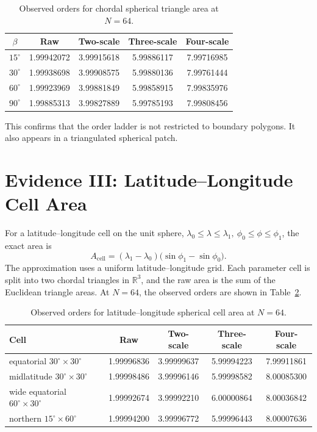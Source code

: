 \documentclass[11pt]{article}
\begin{document}
\begin{table}[h]
\centering
\begin{tabular}{ccccc}
\toprule
$\beta$ & Raw & Two-scale & Three-scale & Four-scale \\
\midrule
$15^\circ$ & 1.99942072 & 3.99915618 & 5.99886117 & 7.99716985 \\
$30^\circ$ & 1.99938698 & 3.99908575 & 5.99880136 & 7.99761444 \\
$60^\circ$ & 1.99923969 & 3.99881849 & 5.99858915 & 7.99835976 \\
$90^\circ$ & 1.99885313 & 3.99827889 & 5.99785193 & 7.99808456 \\
\bottomrule
\end{tabular}
\caption{Observed orders for chordal spherical triangle area at $N=64$.}
\label{tab:tri}
\end{table}

This confirms that the order ladder is not restricted to boundary polygons. It also
appears in a triangulated spherical patch.

\section{Evidence III: Latitude--Longitude Cell Area}
For a latitude--longitude cell on the unit sphere,
$\lambda_0 \le \lambda \le \lambda_1,\ \phi_0 \le \phi \le \phi_1$, the exact area is
\[
A_{\mathrm{cell}} = (\lambda_1 - \lambda_0)\bigl(\sin\phi_1 - \sin\phi_0\bigr).
\]
The approximation uses a uniform latitude--longitude grid. Each parameter cell is split
into two chordal triangles in $\mathbb{R}^3$, and the raw area is the sum of the Euclidean
triangle areas. At $N=64$, the observed orders are shown in Table~\ref{tab:latlon}.

\begin{table}[h]
\centering
\begin{tabular}{lcccc}
\toprule
Cell & Raw & Two-scale & Three-scale & Four-scale \\
\midrule
equatorial $30^\circ\times30^\circ$    & 1.99996836 & 3.99999637 & 5.99994223 & 7.99911861 \\
midlatitude $30^\circ\times30^\circ$   & 1.99998486 & 3.99996146 & 5.99998582 & 8.00085300 \\
wide equatorial $60^\circ\times30^\circ$ & 1.99992674 & 3.99992210 & 6.00000864 & 8.00036842 \\
northern $15^\circ\times60^\circ$      & 1.99994200 & 3.99996772 & 5.99996443 & 8.00007636 \\
\bottomrule
\end{tabular}
\caption{Observed orders for latitude--longitude spherical cell area at $N=64$.}
\label{tab:latlon}
\end{table}
\end{document}
